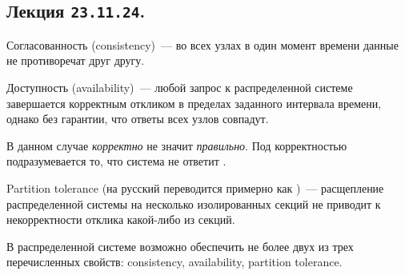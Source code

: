 \subsection{%
  Лекция \texttt{23.11.24}.%
}

\begin{definition}
  Согласованность (consistency)~--- во всех узлах в один момент времени данные
  не противоречат друг другу.
\end{definition}

\begin{definition}
  Доступность (availability)~--- любой запрос к распределенной системе
  завершается корректным откликом в пределах заданного интервала времени, однако
  без гарантии, что ответы всех узлов совпадут.
\end{definition}

\begin{remark}
  В данном случае \textit{корректно} не значит \textit{правильно}. Под
  корректностью подразумевается то, что система не ответит .
\end{remark}

\begin{definition}
  Partition tolerance (на русский переводится примерно как )~--- расщепление распределенной системы на несколько изолированных
  секций не приводит к некорректности отклика какой-либо из секций.
\end{definition}

\begin{theorem}
  В распределенной системе возможно обеспечить не более двух из трех
  перечисленных свойств: consistency, availability, partition tolerance.
\end{theorem}

